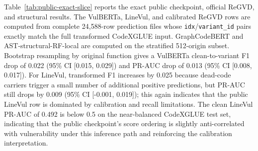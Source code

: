 \documentclass[a4paper,fleqn]{cas-dc}
\begin{document}
Table~\ref{tab:public-exact-slice} reports the exact public checkpoint,
official ReGVD, and structural results. The VulBERTa, LineVul, and calibrated
ReGVD rows are computed from complete 24,588-row prediction files whose
\texttt{idx}/\texttt{variant\_id} pairs exactly match the full transformed
CodeXGLUE input. GraphCodeBERT and AST-structural-RF-local are computed on the
stratified 512-origin subset.
Bootstrap resampling by original function gives a VulBERTa clean-to-variant
F1 drop of 0.022 (95\% CI [0.015, 0.029]) and PR-AUC drop of 0.013 (95\% CI
[0.008, 0.017]). For LineVul, transformed F1 increases by 0.025 because
dead-code carriers trigger a small number of additional positive predictions,
but PR-AUC still drops by 0.009 (95\% CI [-0.001, 0.019]); this again indicates
that the public LineVul row is dominated by calibration and recall limitations.
The clean LineVul PR-AUC of 0.492 is below 0.5 on the near-balanced CodeXGLUE
test set, indicating that the public checkpoint's score ordering is slightly
anti-correlated with vulnerability under this inference path and reinforcing
the calibration interpretation.

\begin{table}[t]
  \centering
  \caption{Primary public detector results on CodeXGLUE. VulBERTa, LineVul, and calibrated ReGVD use 2,732 originals and 21,856 transformed variants; rows marked $\dagger$ use 512 originals and 4,096 transformed variants.}
  \label{tab:public-exact-slice}
\end{table}
\end{document}
